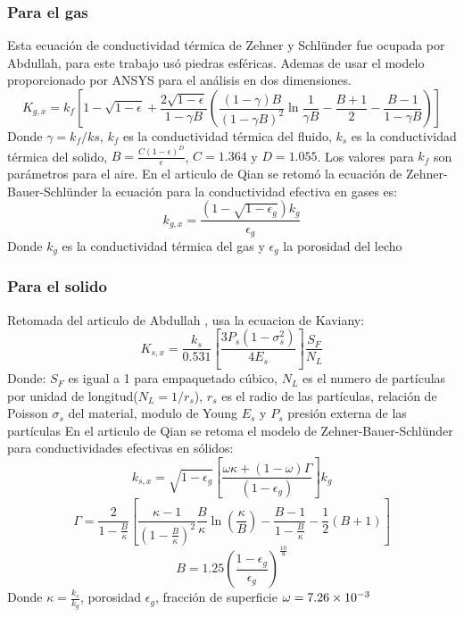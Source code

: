 \documentclass[12pt,letterpaper,final]{article}%
\begin{document}
\subsubsection{Para el gas}
Esta ecuación de conductividad térmica de Zehner y Schlünder\cite{zehner1970} fue ocupada por Abdullah, para este trabajo usó piedras esféricas. Ademas de usar el modelo proporcionado por ANSYS para el análisis en dos dimensiones. \cite{ALI2025}
\begin{equation}\label{Kgx_Zenner}
	K_{g,x}= k_f \left[ 1 - \sqrt{1-\epsilon} + \frac{2\sqrt{1-\epsilon}}{1- \gamma B} \left( \frac{(1-\gamma)B}{(1-\gamma B)^2}\ln \frac{1}{\gamma B} - \frac{B+1}{2}-\frac{B-1}{1-\gamma B}    \right)\right]
\end{equation}
Donde $\gamma = k_f/ks$, $k_f$ es la conductividad térmica del fluido, $k_s$ es la conductividad térmica del solido, $B=\frac{C(1-\epsilon)^D}{\epsilon}$, $C=1.364$ y $D=1.055$. Los valores para $k_f$ son parámetros para el aire.
\newline
En el articulo de Qian \cite{QIAN2018} se retomó la ecuación de Zehner-Bauer-Schlünder la ecuación para la conductividad efectiva en gases es:
\begin{equation}\label{Kgx_ZBS}
	k_{g,x}= \frac{ \left( 1 - \sqrt{1-\epsilon_g} \right)k_g }{\epsilon_g}
\end{equation}
Donde $k_g$ es la conductividad térmica del gas y $\epsilon_g$ la porosidad del lecho
\subsubsection{Para el solido}
Retomada del articulo de Abdullah \cite{ALI2025}, usa la ecuacion de Kaviany\cite{kaviany2012}:
\begin{equation}\label{Ksx_kaviany}
	K_{s,x} = \frac{k_s}{0.531}\left[ \frac{3P_s(1-\sigma_s^2)}{4E_s} \right]\frac{S_F}{N_L}
\end{equation}
Donde: $S_F$ es igual a 1 para empaquetado cúbico, $N_L$ es el numero de partículas por unidad de longitud($N_L=1/r_s$), $r_s$ es el radio de las partículas, relación de Poisson $\sigma_s$ del material, modulo de Young $E_s$ y $P_s$ presión externa de las partículas
\newline
En el articulo de Qian \cite{QIAN2018} se retoma el modelo de Zehner-Bauer-Schlünder para conductividades efectivas en sólidos:
\begin{equation}\label{Ksx_ZBS}
	k_{s,x} = \sqrt{1-\epsilon_g} \left[\frac{ \omega \kappa + (1-\omega)\Gamma }{(1-\epsilon_g)}\right]k_g 
\end{equation}
\begin{equation*}
	\Gamma = \frac{2}{1-\frac{B}{\kappa}} \left[ \frac{\kappa - 1}{(1-\frac{B}{\kappa})^2} \frac{B}{\kappa} \ln\left(\frac{\kappa}{B}\right) - \frac{B-1}{1-\frac{B}{\kappa}} - \frac{1}{2}(B+1)  \right]
\end{equation*}
\begin{equation*}
	B = 1.25 \left( \frac{1-\epsilon_g}{\epsilon_g} \right)^{\frac{10}{9}}
\end{equation*}
Donde $\kappa = \frac{k_s}{k_g}$, porosidad $\epsilon_g$, fracción de superficie $\omega=\num{7.26E-3}$ 
\end{document}
